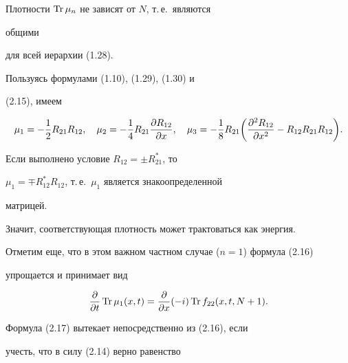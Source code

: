 


\begin{notes} Плотности $\operatorname{Tr}\mu_n$ не зависят от $N$, т.\,е.~являются 


общими 


для всей иерархии (1.28). 


\end{notes} 


 


\begin{notes} Пользуясь формулами (1.10), (1.29), (1.30) и 


(2.15), имеем 


$$


\mu_1=-\frac{1}{2}R_{21}R_{12},\quad 


\mu_2=-\frac{1}{4}R_{21}\myfrac{R_{12}}{x},\quad 


\mu_3=-\frac{1}{8}R_{21}\bigg(\myfrac{^2R_{12}}{x^2}- 


R_{12}R_{21}R_{12}\bigg). 


$$


\end{notes} 


 


\begin{notes} Если выполнено условие $R_{12}=\pm R^*_{21}$, то 


$\mu_1=\mp R^*_{12}R_{12}$, т.\,е.~$\mu_1$ является знакоопределенной 


матрицей. 


Значит, соответствующая плотность может трактоваться как энергия. 


\end{notes} 


 


Отметим еще, что в этом важном частном случае ($n=1$) формула (2.16) 


упрощается и принимает вид 


\begin{equation} 


\myfrac{}{t}\Tr\mu_1(x,t)=\myfrac{}{x}(-i) 


\Tr f_{22}(x,t,N+1). 


\end{equation} 


Формула (2.17) вытекает непосредственно из (2.16), если 


учесть, что в силу (2.14) верно равенство 


